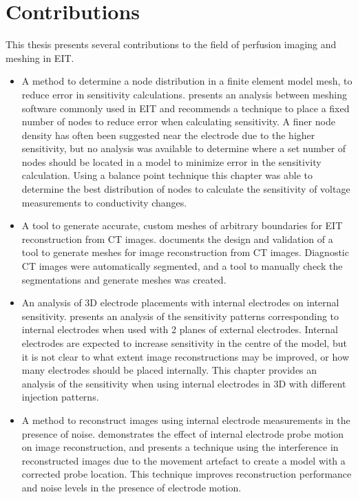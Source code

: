 \section{Contributions}
This thesis presents several contributions to the field of perfusion imaging and 
meshing in EIT.
\begin{itemize}
	\item A method to determine a node distribution in a finite element model mesh,
        to reduce error in sensitivity calculations.  presents an 
        analysis between meshing software commonly used in EIT and recommends a technique to 
        place a fixed number of nodes to reduce error when calculating sensitivity.
        A finer node density has often been suggested near the electrode due to the higher 
        sensitivity, but no analysis was available to determine where a set number of
        nodes should be located in a model to minimize error in the sensitivity calculation. 
        Using a balance point 
        technique this chapter was able to determine the best distribution of nodes
        to calculate the sensitivity of voltage measurements to conductivity changes.
	\item A tool to generate accurate, custom meshes of arbitrary boundaries for EIT reconstruction from 
        CT images.  documents 
        the design and validation of a tool to generate meshes for image reconstruction from CT images. 
        Diagnostic CT images were automatically segmented, and a tool to manually check the segmentations
        and generate meshes was created. 
	\item An analysis of 3D electrode placements with internal electrodes on internal sensitivity. 
         presents an analysis of the sensitivity patterns corresponding to 
        internal electrodes when used with 2 planes of external electrodes. Internal electrodes are
        expected to increase sensitivity in the centre of the model, but it is not clear to what extent 
        image reconstructions may be improved, or how many electrodes should be 
        placed internally. This chapter provides an analysis of the sensitivity when using internal
        electrodes in 3D with different injection patterns.  
	\item A method to reconstruct images using internal electrode measurements in the presence of noise.
         demonstrates the effect of internal electrode probe motion on image 
        reconstruction, and presents a technique using the interference in reconstructed images 
        due to the movement artefact to create a model with a corrected probe location. This technique
        improves reconstruction performance and noise levels in the presence of electrode motion.
\end{itemize}

